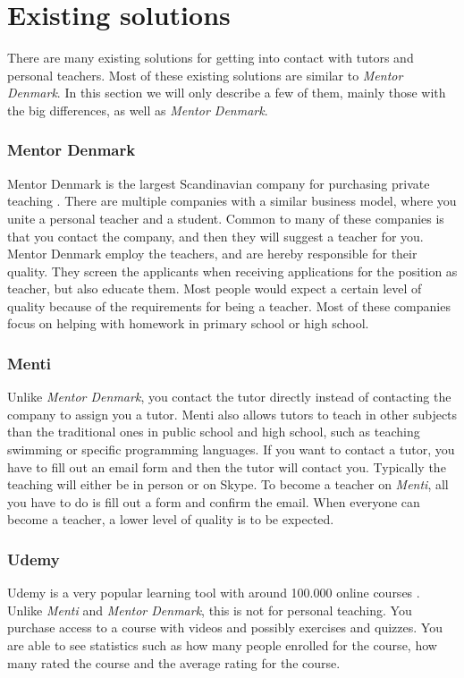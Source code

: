 \section{Existing solutions}
There are many existing solutions for getting into contact with tutors and personal teachers.
Most of these existing solutions are similar to \textit{Mentor Denmark}.  
In this section we will only describe a few of them, mainly those with the big differences, as well as \textit{Mentor Denmark}.

\subsubsection{Mentor Denmark}
Mentor Denmark is the largest Scandinavian company for purchasing private teaching \cite{skandinaviens-stoeste-lektiefirma}.
There are multiple companies with a similar business model, where you unite a personal teacher and a student. 
Common to many of these companies is that you contact the company, and then they will suggest a teacher for you.
Mentor Denmark employ the teachers, and are hereby responsible for their quality. 
They screen the applicants when receiving applications for the position as teacher, but also educate them. 
Most people would expect a certain level of quality because of the requirements for being a teacher.
Most of these companies focus on helping with homework in primary school or high school.

\subsubsection{Menti}
Unlike \textit{Mentor Denmark}, you contact the tutor directly instead of contacting the company to assign you a tutor.
Menti also allows tutors to teach in other subjects than the traditional ones in public school and high school, such as teaching swimming or specific programming languages.
If you want to contact a tutor, you have to fill out an email form and then the tutor will contact you.
Typically the teaching will either be in person or on Skype.
To become a teacher on \textit{Menti}, all you have to do is fill out a form and confirm the email.
When everyone can become a teacher, a lower level of quality is to be expected.

\subsubsection{Udemy}
Udemy is a very popular learning tool with around 100.000 online courses \cite{udemy}.
Unlike \textit{Menti} and \textit{Mentor Denmark}, this is not for personal teaching. 
You purchase access to a course with videos and possibly exercises and quizzes. 
You are able to see statistics such as how many people enrolled for the course, how many rated the course and the average rating for the course.

